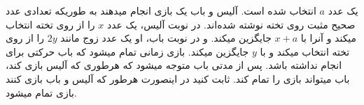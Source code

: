 یک عدد $a$ انتخاب شده است. آلیس و باب یک بازی انجام میدهند به طوریکه تعدادی عدد صحیح مثبت روی تخته نوشته شده‌اند. در نوبت آلیس، یک عدد $x$ را از روی تخته انتخاب میکند و آنرا با $x + a$ جایگزین میکند. و در نوبت باب، او یک عدد زوج مانند $2y$ را از روی تخته انتخاب میکند و با $y$ جایگزین میکند. 
بازی زمانی تمام میشود که باب حرکتی برای انجام نداشته باشد. 
پس از مدتی باب متوجه میشود که هرطوری که آلیس بازی کند، باب میتواند بازی را تمام کند. ثابت کنید در اینصورت هرطور که آلیس و باب بازی کنند بازی تمام میشود.